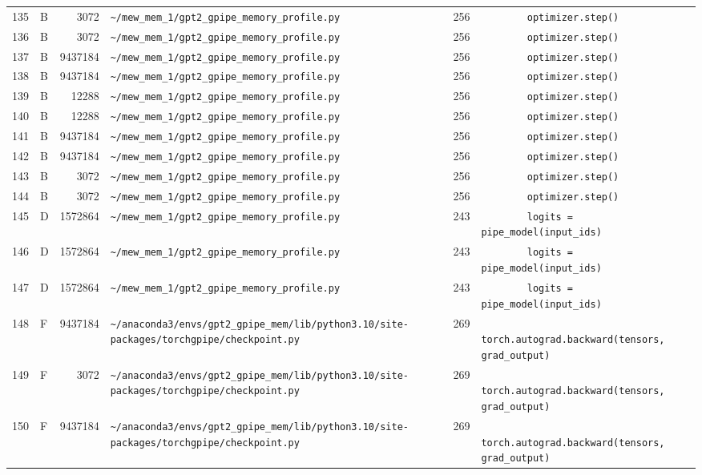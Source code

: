 \documentclass{article}
\begin{document}
\begin{longtable}{r l r p{6.5cm} r p{7.0cm}}
135 & B & 3072 & \lstinline|~/mew_mem_1/gpt2_gpipe_memory_profile.py| & 256 & \lstinline|        optimizer.step()| \\
136 & B & 3072 & \lstinline|~/mew_mem_1/gpt2_gpipe_memory_profile.py| & 256 & \lstinline|        optimizer.step()| \\
137 & B & 9437184 & \lstinline|~/mew_mem_1/gpt2_gpipe_memory_profile.py| & 256 & \lstinline|        optimizer.step()| \\
138 & B & 9437184 & \lstinline|~/mew_mem_1/gpt2_gpipe_memory_profile.py| & 256 & \lstinline|        optimizer.step()| \\
139 & B & 12288 & \lstinline|~/mew_mem_1/gpt2_gpipe_memory_profile.py| & 256 & \lstinline|        optimizer.step()| \\
140 & B & 12288 & \lstinline|~/mew_mem_1/gpt2_gpipe_memory_profile.py| & 256 & \lstinline|        optimizer.step()| \\
141 & B & 9437184 & \lstinline|~/mew_mem_1/gpt2_gpipe_memory_profile.py| & 256 & \lstinline|        optimizer.step()| \\
142 & B & 9437184 & \lstinline|~/mew_mem_1/gpt2_gpipe_memory_profile.py| & 256 & \lstinline|        optimizer.step()| \\
143 & B & 3072 & \lstinline|~/mew_mem_1/gpt2_gpipe_memory_profile.py| & 256 & \lstinline|        optimizer.step()| \\
144 & B & 3072 & \lstinline|~/mew_mem_1/gpt2_gpipe_memory_profile.py| & 256 & \lstinline|        optimizer.step()| \\
145 & D & 1572864 & \lstinline|~/mew_mem_1/gpt2_gpipe_memory_profile.py| & 243 & \lstinline|        logits = pipe_model(input_ids)| \\
146 & D & 1572864 & \lstinline|~/mew_mem_1/gpt2_gpipe_memory_profile.py| & 243 & \lstinline|        logits = pipe_model(input_ids)| \\
147 & D & 1572864 & \lstinline|~/mew_mem_1/gpt2_gpipe_memory_profile.py| & 243 & \lstinline|        logits = pipe_model(input_ids)| \\
148 & F & 9437184 & \lstinline|~/anaconda3/envs/gpt2_gpipe_mem/lib/python3.10/site-packages/torchgpipe/checkpoint.py| & 269 & \lstinline|            torch.autograd.backward(tensors, grad_output)| \\
149 & F & 3072 & \lstinline|~/anaconda3/envs/gpt2_gpipe_mem/lib/python3.10/site-packages/torchgpipe/checkpoint.py| & 269 & \lstinline|            torch.autograd.backward(tensors, grad_output)| \\
150 & F & 9437184 & \lstinline|~/anaconda3/envs/gpt2_gpipe_mem/lib/python3.10/site-packages/torchgpipe/checkpoint.py| & 269 & \lstinline|            torch.autograd.backward(tensors, grad_output)| \\

\end{longtable}
\end{document}
